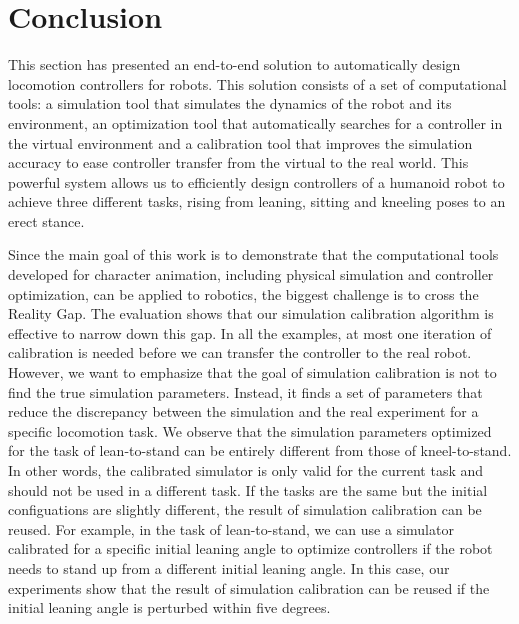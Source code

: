 \section{Conclusion}

This section has presented an end-to-end solution to automatically design locomotion controllers for robots. This solution consists of a set of computational tools: a simulation tool that simulates the dynamics of the robot and its environment, an optimization tool that automatically searches for a controller in the virtual environment and a calibration tool that improves the simulation accuracy to ease controller transfer from the virtual to the real world. This powerful system allows us to efficiently design controllers of a humanoid robot to achieve three different tasks, rising from leaning, sitting and kneeling poses to an erect stance.

Since the main goal of this work is to demonstrate that the computational tools developed for character animation, including physical simulation and controller optimization, can be applied to robotics, the biggest challenge is to cross the Reality Gap. The evaluation shows that our simulation calibration algorithm is effective to narrow down this gap. In all the examples, at most one iteration of calibration is needed before we can transfer the controller to the real robot. However, we want to emphasize that the goal of simulation calibration is not to find the  true simulation parameters. Instead, it finds a set of parameters that reduce the discrepancy between the simulation and the real experiment for a specific locomotion task. We observe that the simulation parameters optimized for the task of lean-to-stand can be entirely different from those of kneel-to-stand. In other words, the calibrated simulator is only valid for the current task and should not be used in a different task. If the tasks are the same but the initial configuations are slightly different, the result of simulation calibration can be reused. For example, in the task of lean-to-stand, we can use a simulator calibrated for a specific initial leaning angle to optimize controllers if the robot needs to stand up from a different initial leaning angle. In this case, our experiments show that the result of simulation calibration can be reused if the initial leaning angle is perturbed within five degrees. 

